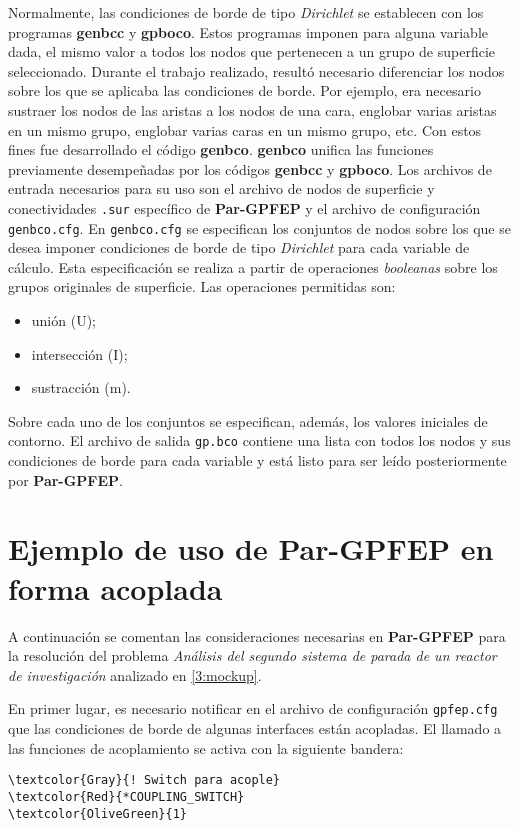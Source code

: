 Normalmente, las condiciones de borde de tipo \textit{Dirichlet} se establecen con los programas \textbf{genbcc} y \textbf{gpboco}.
Estos programas imponen para alguna variable dada, el mismo valor a todos los nodos que pertenecen a un grupo de superficie seleccionado.
Durante el trabajo realizado, resultó necesario diferenciar los nodos sobre los que se aplicaba las condiciones de borde.
Por ejemplo, era necesario sustraer los nodos de las aristas a los nodos de una cara, englobar varias aristas en un mismo grupo, englobar varias caras en un mismo grupo, etc.
Con estos fines fue desarrollado el código \textbf{genbco}.
\textbf{genbco} unifica las funciones previamente desempeñadas por los códigos \textbf{genbcc} y \textbf{gpboco}.
Los archivos de entrada necesarios para su uso son el archivo de nodos de superficie y conectividades \texttt{.sur} específico de \textbf{Par-GPFEP}
y el archivo de configuración \texttt{genbco.cfg}.
En \texttt{genbco.cfg} se especifican los conjuntos de nodos sobre los que se desea imponer condiciones de borde de tipo \textit{Dirichlet} para cada variable de cálculo.
Esta especificación se realiza a partir de operaciones \textit{booleanas} sobre los grupos originales de superficie.
Las operaciones permitidas son:
\begin{itemize}
\item unión (U);
\item intersección (I);
\item sustracción (m).
\end{itemize}
Sobre cada uno de los conjuntos se especifican, además, los valores iniciales de contorno.
El archivo de salida \texttt{gp.bco} contiene una lista con todos los nodos y sus condiciones de borde para cada variable y está listo para ser leído posteriormente por \textbf{Par-GPFEP}.


\section{Ejemplo de uso de \textbf{Par-GPFEP} en forma acoplada}
\label{pargpfep-coup}

A continuación se comentan las consideraciones necesarias en \textbf{Par-GPFEP}
para la resolución del problema \textit{Análisis del segundo sistema de parada de un reactor de investigación} analizado en \ref{3:mockup}.

En primer lugar, es necesario notificar en el archivo de configuración \texttt{gpfep.cfg} que las condiciones de borde de algunas interfaces están acopladas.
El llamado a las funciones de acoplamiento se activa con la siguiente bandera:
\begin{Verbatim}[frame=single,commandchars=\\\{\}]
\textcolor{Gray}{! Switch para acople}
\textcolor{Red}{*COUPLING_SWITCH}
\textcolor{OliveGreen}{1}
\end{Verbatim}

